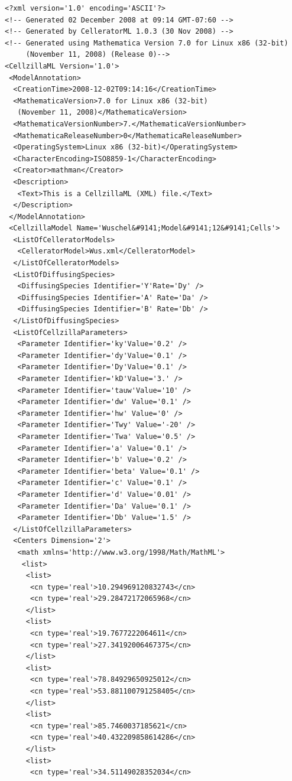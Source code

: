 \documentclass[12pt,letterpaper]{article}
\begin{document}
\begin{verbatim}
<?xml version='1.0' encoding='ASCII'?>
<!-- Generated 02 December 2008 at 09:14 GMT-07:60 -->
<!-- Generated by CelleratorML 1.0.3 (30 Nov 2008) -->
<!-- Generated using Mathematica Version 7.0 for Linux x86 (32-bit) 
     (November 11, 2008) (Release 0)-->
<CellzillaML Version='1.0'>
 <ModelAnnotation>
  <CreationTime>2008-12-02T09:14:16</CreationTime>
  <MathematicaVersion>7.0 for Linux x86 (32-bit) 
   (November 11, 2008)</MathematicaVersion>
  <MathematicaVersionNumber>7.</MathematicaVersionNumber>
  <MathematicaReleaseNumber>0</MathematicaReleaseNumber>
  <OperatingSystem>Linux x86 (32-bit)</OperatingSystem>
  <CharacterEncoding>ISO8859-1</CharacterEncoding>
  <Creator>mathman</Creator>
  <Description>
   <Text>This is a CellzillaML (XML) file.</Text>
  </Description>
 </ModelAnnotation>
 <CellzillaModel Name='Wuschel&#9141;Model&#9141;12&#9141;Cells'>
  <ListOfCelleratorModels>
   <CelleratorModel>Wus.xml</CelleratorModel>
  </ListOfCelleratorModels>
  <ListOfDiffusingSpecies>
   <DiffusingSpecies Identifier='Y'Rate='Dy' />
   <DiffusingSpecies Identifier='A' Rate='Da' />
   <DiffusingSpecies Identifier='B' Rate='Db' />
  </ListOfDiffusingSpecies>
  <ListOfCellzillaParameters>
   <Parameter Identifier='ky'Value='0.2' />
   <Parameter Identifier='dy'Value='0.1' />
   <Parameter Identifier='Dy'Value='0.1' />
   <Parameter Identifier='kD'Value='3.' />
   <Parameter Identifier='tauw'Value='10' />
   <Parameter Identifier='dw' Value='0.1' />
   <Parameter Identifier='hw' Value='0' />
   <Parameter Identifier='Twy' Value='-20' />
   <Parameter Identifier='Twa' Value='0.5' />
   <Parameter Identifier='a' Value='0.1' />
   <Parameter Identifier='b' Value='0.2' />
   <Parameter Identifier='beta' Value='0.1' />
   <Parameter Identifier='c' Value='0.1' />
   <Parameter Identifier='d' Value='0.01' />
   <Parameter Identifier='Da' Value='0.1' />
   <Parameter Identifier='Db' Value='1.5' />
  </ListOfCellzillaParameters>
  <Centers Dimension='2'>
   <math xmlns='http://www.w3.org/1998/Math/MathML'>
    <list>
     <list>
      <cn type='real'>10.294969120832743</cn>
      <cn type='real'>29.28472172065968</cn>
     </list>
     <list>
      <cn type='real'>19.7677222064611</cn>
      <cn type='real'>27.34192006467375</cn>
     </list>
     <list>
      <cn type='real'>78.84929650925012</cn>
      <cn type='real'>53.881100791258405</cn>
     </list>
     <list>
      <cn type='real'>85.7460037185621</cn>
      <cn type='real'>40.432209858614286</cn>
     </list>
     <list>
      <cn type='real'>34.51149028352034</cn>

\end{verbatim}
\end{document}
